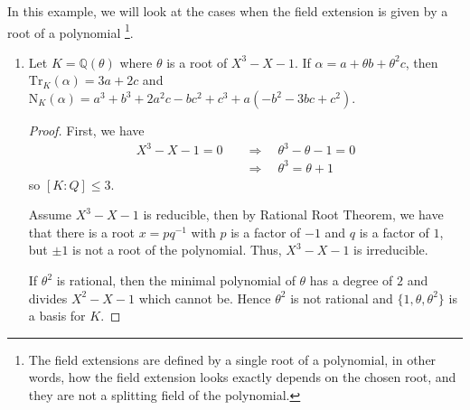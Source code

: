 \begin{example}
    In this example, we will look at the cases when the field extension is given by a root of a polynomial \footnote{The field extensions are defined by a single root of a polynomial, in other words, how the field extension looks exactly depends on the chosen root, and they are not a splitting field of the polynomial.}.
    \begin{enumerate}
        \item Let \(K = \mathbb{Q}(\theta)\) where \(\theta\) is a root of \(X^3 - X - 1\). If \(\alpha = a + \theta b + \theta^2 c\), then \(\mathrm{Tr}_K(\alpha) = 3a + 2c\) and \(\mathrm{N}_K(\alpha) = a^3 + b^3 + 2 a^2 c - b c^2 + c^3 + a (-b^2 - 3 b c + c^2)\).
        \begin{proof}
            First, we have
            \begin{align*}
                X^3 - X - 1 = 0 \quad &\Rightarrow \quad \theta^3 - \theta - 1 =0 \\
                &\Rightarrow \quad \theta^3 = \theta + 1
            \end{align*}
            so \([K:Q] \leq 3\).
            
            Assume \(X^3 - X - 1\) is reducible, then by Rational Root Theorem, we have that there is a root \(x = pq^{-1}\) with \(p\) is a factor of \(-1\) and \(q\) is a factor of \(1\), but \(\pm 1\) is not a root of the polynomial. Thus, \(X^3 - X - 1\) is irreducible.

            If \(\theta^2\) is rational, then the minimal polynomial of \(\theta\) has a degree of \(2\) and divides \(X^2 - X - 1\) which cannot be. Hence \(\theta^2\) is not rational and \(\{1, \theta, \theta^2\}\) is a basis for \(K\).


\end{proof}
\end{enumerate}
\end{example}
